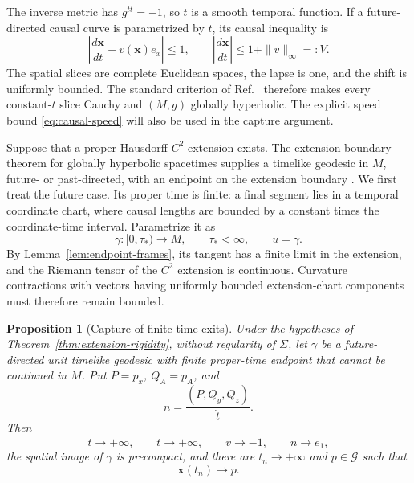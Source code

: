 \documentclass[10pt]{article}
\newtheorem{proposition}[theorem]{Proposition}
\begin{document}
The inverse metric has \(g^{tt}=-1\), so \(t\) is a smooth temporal function.
If a future-directed causal curve is parametrized by \(t\), its causal
inequality is
\begin{equation}
  \left|\frac{d\boldsymbol{x}}{dt}-v(\boldsymbol{x})e_x\right|\leq1,
  \qquad
  \left|\frac{d\boldsymbol{x}}{dt}\right|
  \leq1+\|v\|_\infty=:V .
  \label{eq:causal-speed}
\end{equation}
The spatial slices are complete Euclidean spaces, the lapse is one, and
the shift is uniformly bounded.  The standard criterion of
Ref.~\cite[Theorem~2.1]{ChoquetBruhatCotsakis2002} therefore makes every
constant-\(t\) slice Cauchy and \((M,g)\) globally hyperbolic.  The explicit
speed bound \eqref{eq:causal-speed} will also be used in the capture argument.

Suppose that a proper Hausdorff \(C^2\) extension exists.
The extension-boundary
theorem for globally hyperbolic spacetimes supplies a timelike geodesic in
\(M\), future- or past-directed, with an endpoint on the extension boundary
\cite[Theorem~2]{GallowayLingSbierski2018}.  We first treat the future case.
Its proper time is finite: a final segment lies in a temporal coordinate
chart, where causal lengths are bounded by a constant times the
coordinate-time interval.  Parametrize it as
\begin{equation}
  \gamma:[0,\tau_*)\longrightarrow M,
  \qquad \tau_*<\infty,
  \qquad u=\dot\gamma .
  \label{eq:extension-geodesic}
\end{equation}
By Lemma~\ref{lem:endpoint-frames}, its tangent has a finite limit in the
extension, and the Riemann tensor of the
\(C^2\) extension is continuous.  Curvature contractions with vectors having
uniformly bounded extension-chart components must therefore remain bounded.

\begin{proposition}[Capture of finite-time exits]
\label{prop:capture}
Under the hypotheses of Theorem~\ref{thm:extension-rigidity}, without
regularity of \(\Sigma\), let \(\gamma\) be
a future-directed unit timelike geodesic with finite proper-time endpoint that
cannot be continued in \(M\).  Put \(P=p_x\), \(Q_A=p_A\), and
\begin{equation}
  n=\frac{(P,Q_y,Q_z)}{\dot t}.
\end{equation}
Then
\begin{equation}
  t\to+\infty,\qquad \dot t\to+\infty,\qquad
  v\to-1,\qquad n\to e_1,
  \label{eq:capture-limits}
\end{equation}
the spatial image of \(\gamma\) is precompact, and there are
\(t_n\to+\infty\) and \(p\in\mathcal G\) such that
\begin{equation}
  \boldsymbol{x}(t_n)\longrightarrow p.
  \label{eq:capture-subsequence}
\end{equation}
\end{proposition}
\end{document}
